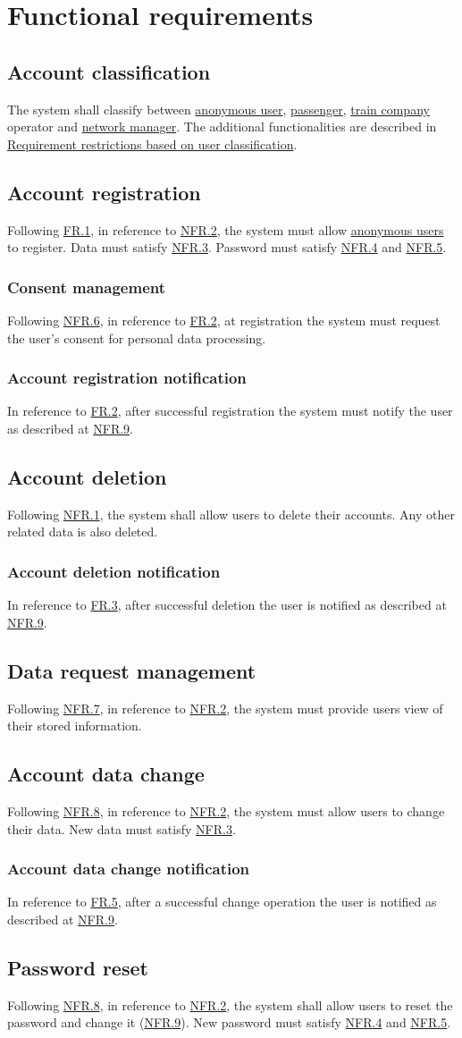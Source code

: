 \documentclass[12pt]{article}
\renewcommand\it[1]{\textit{#1}}
\newcommand\un[1]{\underline{#1}}
\newcommand\hyl[1]{\hyperref[#1]{#1}}
\newcommand\subs[2]{\subsection{#1}\label{#2}}
\newcommand\ssubs[2]{\subsubsection{#1}\label{#2}}
\begin{document}

\newpage

\section{Functional requirements}
\subs{Account classification}{FR.1}
The system shall classify between \un{anonymous user}, \un{passenger}, \un{train company} operator and \un{network manager}. 
The additional functionalities are described in 
\hyperref[Table1]{Requirement restrictions based on user classification}.

\subs{Account registration}{FR.2}
Following \hyl{FR.1}, in reference to \hyl{NFR.2}, the system must allow \un{anonymous users} to register. Data must 
satisfy \hyl{NFR.3}. Password must satisfy \hyl{NFR.4} and \hyl{NFR.5}.

\ssubs{Consent management}{FR.2.1}
Following \hyl{NFR.6}, in reference to \hyl{FR.2}, at registration the system must request the user's consent for personal 
data processing.

\ssubs{Account registration notification}{FR.2.2}
In reference to \hyl{FR.2}, after successful registration the system must notify the user as described at \hyl{NFR.9}.

\subs{Account deletion}{FR.3}
Following \hyl{NFR.1}, the system shall allow users to delete their accounts. Any other related data is also deleted.

\ssubs{Account deletion notification}{FR.3.1}
In reference to \hyl{FR.3}, after successful deletion the user is notified as described at \hyl{NFR.9}.

\subs{Data request management}{FR.4}
Following \hyl{NFR.7}, in reference to \hyl{NFR.2}, the system must provide users view of their stored information.

\subs{Account data change}{FR.5}
Following \hyl{NFR.8}, in reference to \hyl{NFR.2}, the system must allow users to change their data. New data must 
satisfy \hyl{NFR.3}.

\ssubs{Account data change notification}{FR.5.1}
In reference to \hyl{FR.5}, after a successful change operation the user is notified as described at \hyl{NFR.9}.

\subs{Password reset}{FR.6}
Following \hyl{NFR.8}, in reference to \hyl{NFR.2}, the system shall allow users to reset the password and change it (\hyl{NFR.9}). 
New password must satisfy \hyl{NFR.4} and \hyl{NFR.5}.
\end{document}
